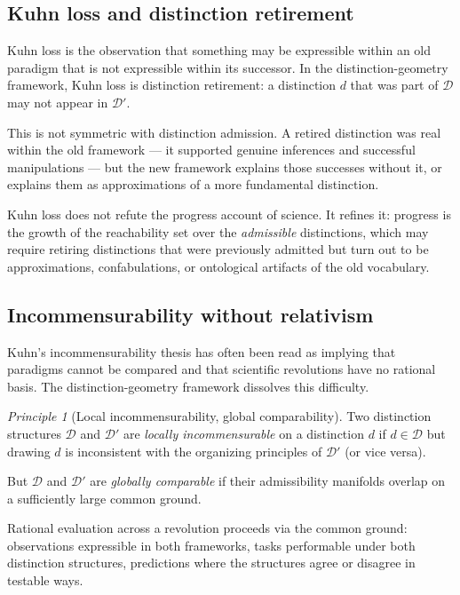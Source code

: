 \documentclass[11pt, a4paper]{article}
\theoremstyle{plain}
\theoremstyle{definition}
\theoremstyle{remark}
\newtheorem{principle}[theorem]{Principle}
\newcommand{\Dist}{\mathcal{D}}
\begin{document}
\subsection{Kuhn loss and distinction retirement}

Kuhn loss is the observation that something may be expressible
within an old paradigm that is not expressible within its
successor. In the distinction-geometry framework, Kuhn loss is
distinction retirement: a distinction $d$ that was part of $\Dist$
may not appear in $\Dist'$.

This is not symmetric with distinction admission. A retired
distinction was real within the old framework --- it supported
genuine inferences and successful manipulations --- but the new
framework explains those successes without it, or explains them
as approximations of a more fundamental distinction.

Kuhn loss does not refute the progress account of science.
It refines it: progress is the growth of the reachability set
over the \emph{admissible} distinctions, which may require retiring
distinctions that were previously admitted but turn out to be
approximations, confabulations, or ontological artifacts of the
old vocabulary.

\subsection{Incommensurability without relativism}

Kuhn's incommensurability thesis has often been read as implying
that paradigms cannot be compared and that scientific revolutions
have no rational basis. The distinction-geometry framework
dissolves this difficulty.

\begin{principle}[Local incommensurability, global comparability]
\label{prin:incomm}
Two distinction structures $\Dist$ and $\Dist'$ are
\emph{locally incommensurable} on a distinction $d$ if
$d \in \Dist$ but drawing $d$ is inconsistent with the
organizing principles of $\Dist'$ (or vice versa).

But $\Dist$ and $\Dist'$ are \emph{globally comparable}
if their admissibility manifolds overlap on a sufficiently
large common ground.

Rational evaluation across a revolution proceeds via the common
ground: observations expressible in both frameworks, tasks
performable under both distinction structures, predictions
where the structures agree or disagree in testable ways.
\end{principle}
\end{document}
